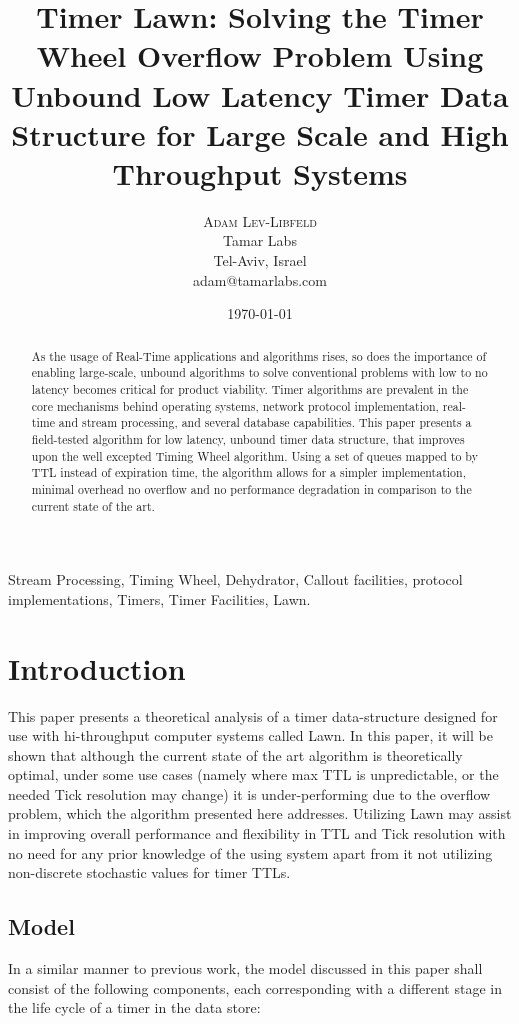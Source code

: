\documentclass[conference]{IEEEtran}
\title{Timer Lawn: Solving the Timer Wheel Overflow Problem Using Unbound Low Latency Timer Data Structure for Large Scale and High Throughput Systems}
\author{
	\textsc{Adam Lev-Libfeld} \\[1ex]
	\normalsize Tamar Labs \\
	\normalsize Tel-Aviv, Israel \\
	\normalsize{adam@tamarlabs.com}
}
\date{\today}
\begin{document}
\maketitle

\begin{abstract}
As the usage of Real-Time applications and algorithms rises, so does the importance of enabling large-scale, unbound algorithms to solve conventional problems with low to no latency becomes critical for product viability\cite{REND, WHT}. Timer algorithms are prevalent in the core mechanisms behind operating systems\cite{BSD}, network protocol implementation, real-time and stream processing, and several database capabilities. This paper presents a field-tested algorithm for low latency, unbound timer data structure, that improves upon the well excepted Timing Wheel algorithm. Using a set of queues mapped to by TTL instead of expiration time, the algorithm allows for a simpler implementation, minimal overhead no overflow and no performance degradation in comparison to the current state of the art.
\end{abstract}

\begin{IEEEkeywords}
Stream Processing, Timing Wheel, Dehydrator, Callout facilities, protocol implementations, Timers, Timer Facilities, Lawn.
\end{IEEEkeywords}

\section{Introduction}
This paper presents a theoretical analysis of a timer data-structure designed for use with hi-throughput computer systems called Lawn. In this paper, it will be shown that although the current state of the art algorithm is theoretically optimal, under some use cases (namely where max TTL is unpredictable, or the needed Tick resolution may change) it is under-performing due to the overflow problem, which the algorithm presented here addresses. Utilizing Lawn may assist in improving overall performance and flexibility in TTL and Tick resolution with no need for any prior knowledge of the using system apart from it not utilizing non-discrete stochastic values for timer TTLs.
\subsection{Model}
In a similar manner to previous work\cite{TW, CQ, EMP}, the model discussed in this paper shall consist of the following components, each corresponding with a different stage in the life cycle of a timer in the data store:
\end{document}
